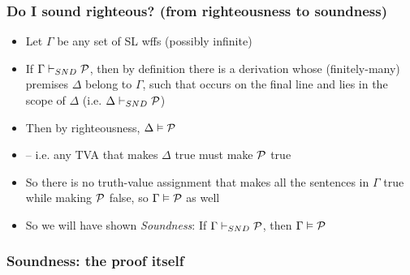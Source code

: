 \begin{frame}
\frametitle{Do I sound righteous? (from righteousness to soundness)}

\begin{itemize}[<+->]


\item Let $\Gamma$ be any set of SL wffs (possibly infinite)

\item If $\Gamma \vdash_{SND} \mathcal{P}$, then by definition there is a derivation whose (finitely-many) premises $\Delta$ belong to $\Gamma$, such that  occurs on the final line and lies in the scope of $\Delta$ (i.e. $\Delta \vdash_{SND} \mathcal{P}$)

\item Then by righteousness, $\Delta \vDash \mathcal{P}$

\item[] -- i.e. any TVA that makes $\Delta$ true must make $\mathcal{P}$ true


\item So there is no truth-value assignment that makes all the sentences in $\Gamma$ true while making $\mathcal{P}$ false, so $\Gamma \vDash \mathcal{P}$ as well

\item So we will have shown \emph{Soundness}: If $\Gamma \vdash_{SND} \mathcal{P}$, then $\Gamma \vDash \mathcal{P}$

\end{itemize}
\end{frame}

\subsubsection{Soundness: the proof itself}

